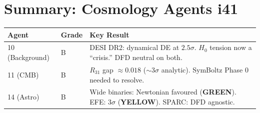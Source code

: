 \documentclass[11pt,a4paper]{article}
\newcommand{\GREEN}{\textcolor{dfdgreen}{\textbf{GREEN}}}
\newcommand{\YELLOW}{\textcolor{dfdyellow}{\textbf{YELLOW}}}
\begin{document}
\section*{Summary: Cosmology Agents i41}

\begin{center}
\begin{tabular}{llp{8cm}}
\toprule
\textbf{Agent} & \textbf{Grade} & \textbf{Key Result} \\
\midrule
10 (Background) & B & DESI DR2: dynamical DE at $2.5\sigma$. $H_0$ tension now a ``crisis.'' DFD neutral on both. \\
11 (CMB) & B & $R_{31}$ gap $\approx 0.018$ ($\sim 3\sigma$ analytic). SymBoltz Phase 0 needed to resolve. \\
14 (Astro) & B & Wide binaries: Newtonian favoured (\GREEN). EFE: $3\sigma$ (\YELLOW). SPARC: DFD agnostic. \\
\bottomrule
\end{tabular}
\end{center}
\end{document}
